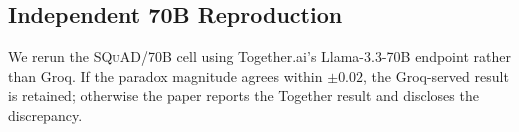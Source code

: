 
\subsection{Independent 70B Reproduction}
\label{sec:fix07_together}

We rerun the \textsc{SQuAD}/70B cell using Together.ai's Llama-3.3-70B
endpoint rather than Groq. If the paradox magnitude agrees within
$\pm 0.02$, the Groq-served result is retained; otherwise the paper reports
the Together result and discloses the discrepancy.

